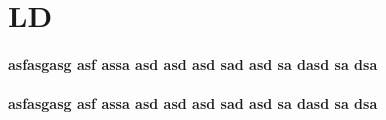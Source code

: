 \section{LD}

\paragraph
	{
	asfasgasg asf assa asd asd asd sad 
	asd sa dasd sa dsa
	}
\paragraph
	{
	asfasgasg asf assa asd asd asd sad 
	asd sa dasd sa dsa
	}